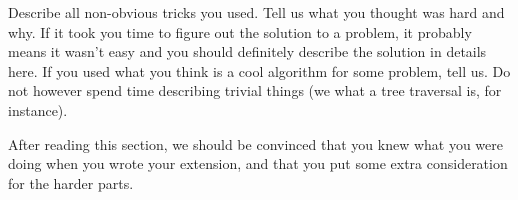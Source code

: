Describe all non-obvious tricks you used. Tell us what you thought was hard and
why. If it took you time to figure out the solution to a problem, it probably
means it wasn't easy and you should definitely describe the solution in details
here. If you used what you think is a cool algorithm for some problem, tell us.
Do not however spend time describing trivial things (we what a tree traversal
is, for instance). 

After reading this section, we should be convinced that you knew what you were
doing when you wrote your extension, and that you put some extra consideration
for the harder parts.

